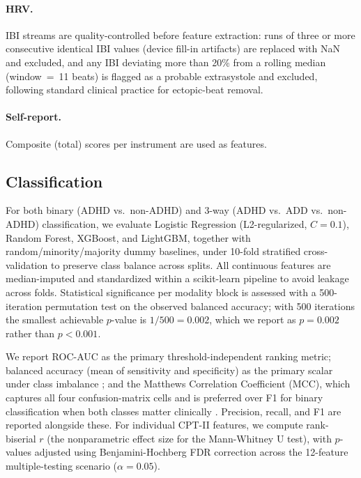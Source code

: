 \documentclass[11pt]{article}
\begin{document}
\paragraph{HRV.} IBI streams are quality-controlled before feature extraction: runs of three or more consecutive identical IBI values (device fill-in artifacts) are replaced with NaN and excluded, and any IBI deviating more than 20\% from a rolling median (window~=~11 beats) is flagged as a probable extrasystole and excluded, following standard clinical practice for ectopic-beat removal.

\paragraph{Self-report.} Composite (total) scores per instrument are used as features.

\subsection{Classification}

For both binary (ADHD vs.\ non-ADHD) and 3-way (ADHD vs.\ ADD vs.\ non-ADHD) classification, we evaluate Logistic Regression (L2-regularized, $C=0.1$), Random Forest, XGBoost, and LightGBM, together with random/minority/majority dummy baselines, under 10-fold stratified cross-validation to preserve class balance across splits. All continuous features are median-imputed and standardized within a scikit-learn pipeline to avoid leakage across folds. Statistical significance per modality block is assessed with a 500-iteration permutation test on the observed balanced accuracy; with 500 iterations the smallest achievable $p$-value is $1/500 = 0.002$, which we report as $p=0.002$ rather than $p<0.001$.

We report ROC-AUC as the primary threshold-independent ranking metric; balanced accuracy (mean of sensitivity and specificity) as the primary scalar under class imbalance \citep{brodersen2010balanced}; and the Matthews Correlation Coefficient (MCC), which captures all four confusion-matrix cells and is preferred over F1 for binary classification when both classes matter clinically \citep{chicco2020advantages}. Precision, recall, and F1 are reported alongside these. For individual CPT-II features, we compute rank-biserial $r$ (the nonparametric effect size for the Mann-Whitney U test), with $p$-values adjusted using Benjamini-Hochberg FDR correction across the 12-feature multiple-testing scenario ($\alpha=0.05$).
\end{document}
